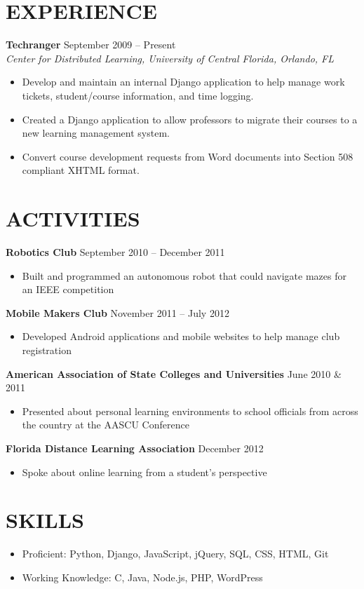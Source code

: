 \documentclass[margin]{res}
\begin{document}
\begin{resume}
\section{EXPERIENCE} 
\textbf{Techranger} \hfill September 2009 -- Present \\
\textit{Center for Distributed Learning, University of Central Florida, Orlando, FL} \smallskip
\begin{itemize}[leftmargin=10pt]
\item Develop and maintain an internal Django application to help manage work tickets, student/course information, and time logging.
\item Created a Django application to allow professors to migrate their courses to a new learning management system.
\item Convert course development requests from Word documents into Section 508 compliant XHTML format.
\end{itemize}

\section{ACTIVITIES}             
\textbf{Robotics Club} \hfill September 2010 -- December 2011
\begin{itemize}[leftmargin=10pt]
\itemsep -2pt %
\item Built and programmed an autonomous robot that could navigate mazes for an IEEE competition
\end{itemize}

\textbf{Mobile Makers Club} \hfill November 2011 -- July 2012 
\begin{itemize}[leftmargin=10pt]
\itemsep -2pt %
\item Developed Android applications and mobile websites to help manage club registration
\end{itemize}

\textbf{American Association of State Colleges and Universities} \hfill June 2010 \& 2011
\begin{itemize}[leftmargin=10pt]
\itemsep -2pt %
\item Presented about personal learning environments to school officials from across the country at the AASCU Conference
\end{itemize}

\textbf{Florida Distance Learning Association} \hfill December 2012
\begin{itemize}[leftmargin=10pt]
\itemsep -2pt %
\item Spoke about online learning from a student's perspective
\end{itemize}

\section{SKILLS}
\begin{itemize}[leftmargin=0pt]
\item[] Proficient: Python, Django, JavaScript, jQuery, SQL, CSS, HTML, Git
\item[] Working Knowledge: C, Java, Node.js, PHP, WordPress
\end{itemize}

\end{resume}
\end{document}
